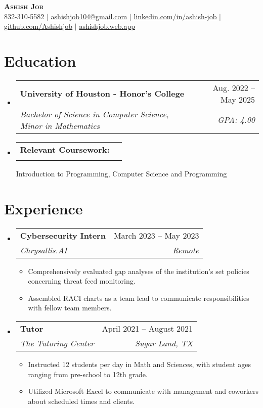 \documentclass[letterpaper,11pt]{article}
\makeatletter
\newcommand{\resumeItem}[1]{
  \item\small{
    {#1 \vspace{-2pt}}
  }
}
\newcommand{\resumeSubheading}[4]{
  \vspace{-2pt}\item
    \begin{tabular*}{0.97\textwidth}[t]{l@{\extracolsep{\fill}}r}
      \textbf{#1} & #2 \\
      \textit{\small#3} & \textit{\small #4} \\
    \end{tabular*}\vspace{-7pt}
}
\newcommand{\resumeSubHeadingListStart}{\begin{itemize}[leftmargin=0.15in, label={}]}
\newcommand{\resumeSubHeadingListEnd}{\end{itemize}}
\newcommand{\resumeItemListStart}{\begin{itemize}}
\newcommand{\resumeItemListEnd}{\end{itemize}\vspace{-5pt}}
\makeatother
\begin{document}

\begin{center}
    \textbf{\Huge \scshape Ashish Job} \\ \vspace{1pt}
    \small {832-310-5582} $|$ \href{mailto:ashishjob104@gmail.com}{{ashishjob104@gmail.com}} $|$ 
    \href{https://linkedin.com/in/ashish-job/}{{linkedin.com/in/ashish-job}} 
    $|$ \href{https://github.com/Ashishjob}{{github.com/Ashishjob}}
    $|$ \href{https://ashishjob.web.app/}{{ashishjob.web.app}}
    
\end{center}


\section{Education}
  \resumeSubHeadingListStart
    \resumeSubheading
      {University of Houston - Honor's College}{Aug. 2022 -- May 2025}
      {Bachelor of Science in Computer Science, Minor in Mathematics}{GPA: 4.00}
    \resumeSubheading{Relevant Coursework:}{}{}{}{Introduction to Programming,}{ Computer Science and Programming}
  \resumeSubHeadingListEnd


\section{Experience}
  \resumeSubHeadingListStart
  
    \resumeSubheading
      {Cybersecurity Intern}{March 2023 -- May 2023}
      {Chrysallis.AI}{Remote}
      \resumeItemListStart
        \resumeItem{Comprehensively evaluated gap analyses of the institution's set policies concerning threat feed monitoring.}
        \resumeItem{Assembled RACI charts as a team lead to communicate responsibilities with fellow team members.}
      \resumeItemListEnd
      
    \resumeSubheading
      {Tutor}{April 2021 -- August 2021}
      {The Tutoring Center}{Sugar Land, TX}
      \resumeItemListStart
        \resumeItem{Instructed 12 students per day in Math and Sciences, with student ages ranging from pre-school to 12th grade.}
        \resumeItem{Utilized Microsoft Excel to communicate with management and coworkers about scheduled times and clients.}
      \resumeItemListEnd
    \resumeSubHeadingListEnd
      
\end{document}

